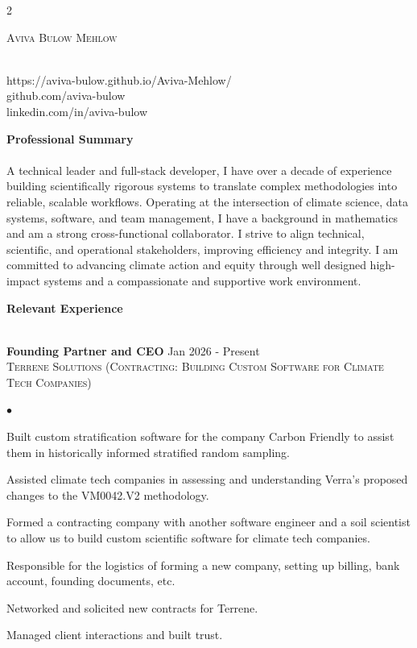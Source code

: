 \documentclass{article}
\newcommand{\lineunder}{\vspace*{-8pt} \\ \hspace*{-18pt} \hrulefill \\}
\newcommand{\header}[1]{{\vspace*{8pt}\hspace*{-16pt} {\textbf{\large{#1}}}} \vspace*{4pt} \lineunder \vspace*{4pt}}
\newcommand{\experience}[4]{{\vspace{0pt}\bf{#1}} \hfill  #2\\{\textsc{#3} \hfill \emph{#4}\\  }}
\newcommand{\contact}[5]{
\begin{multicols}{2}
    \raggedcolumns
    \begin{flushleft}
    { \huge \scshape {#1}}\\
    \end{flushleft}
    
\columnbreak

    \begin{flushright}
    #2 \\ 
    #3 \\
    #4 \\
    #5 \\
    \end{flushright}

\end{multicols}

}
\newenvironment{achievements}{\begin{list}{$\bullet$}{\topsep 0pt \itemsep -2pt}}{\vspace*{4pt}\end{list}}
\begin{document}
\small

\contact{Aviva Bulow Mehlow}{}{https://aviva-bulow.github.io/Aviva-Mehlow/}{github.com/aviva-bulow}{linkedin.com/in/aviva-bulow}

\vspace{-20pt}

\header{Professional Summary}
 A technical leader and full-stack developer, I have over a decade of experience building scientifically rigorous systems to translate complex methodologies into reliable, scalable workflows. Operating at the intersection of climate science, data systems, software, and team management, I have a background in mathematics and am a strong cross-functional collaborator. I strive to align technical, scientific, and operational stakeholders, improving efficiency and integrity. I am committed to advancing climate action and equity through well designed high-impact systems and a compassionate and supportive work environment.
 



\header{Relevant Experience}

\experience{Founding Partner and CEO}{Jan 2026 - Present}{Terrene Solutions \textnormal{(Contracting: Building Custom Software for Climate Tech Companies)}}{}

\begin{achievements}
    \item Built custom stratification software for the company Carbon Friendly to assist them in historically informed stratified random sampling. 
    \item Assisted climate tech companies in assessing and understanding Verra's proposed changes to the VM0042.V2 methodology. 
    \item Formed a contracting company with another software engineer and a soil scientist to allow us to build custom scientific software for climate tech companies.
    \item Responsible for the logistics of forming a new company, setting up billing, bank account, founding documents, etc.
    \item Networked and solicited new contracts for Terrene. 
    \item Managed client interactions and built trust. 
    
\end{achievements}
\end{document}
